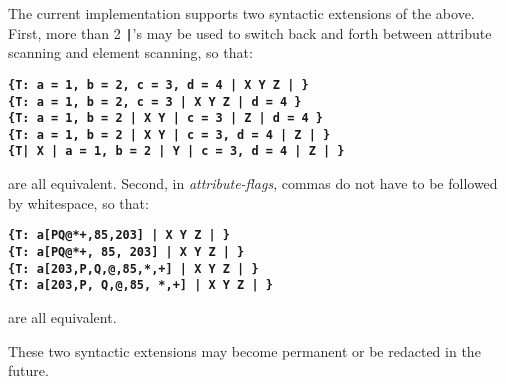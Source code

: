 \documentclass[12pt]{article}
\newcommand{\TT}[1]{{\tt \bfseries #1}}
\begin{document}
The current implementation supports two syntactic extensions of
the above.  First, more than 2 \TT{|}'s may be used to switch
back and forth between attribute scanning and element scanning,
so that:
\begin{center}
\TT{\{T: a = 1, b = 2, c = 3, d = 4 | X Y Z | \}} \\
\TT{\{T: a = 1, b = 2, c = 3 | X Y Z | d = 4 \}} \\
\TT{\{T: a = 1, b = 2 | X Y | c = 3 | Z | d = 4 \}} \\
\TT{\{T: a = 1, b = 2 | X Y | c = 3, d = 4 | Z | \}} \\
\TT{\{T| X | a = 1, b = 2 | Y | c = 3, d = 4 | Z | \}} \\
\end{center}
are all equivalent.  Second, in {\em attribute-flags}, commas
do not have to be followed by whitespace, so that:
\begin{center}
\TT{\{T: a[PQ@*+,85,203] | X Y Z | \}} \\
\TT{\{T: a[PQ@*+, 85, 203] | X Y Z | \}} \\
\TT{\{T: a[203,P,Q,@,85,*,+] | X Y Z | \}} \\
\TT{\{T: a[203,P, Q,@,85, *,+] | X Y Z | \}} \\
\end{center}
are all equivalent.

These two syntactic extensions may become permanent or be
redacted in the future.
\end{document}
